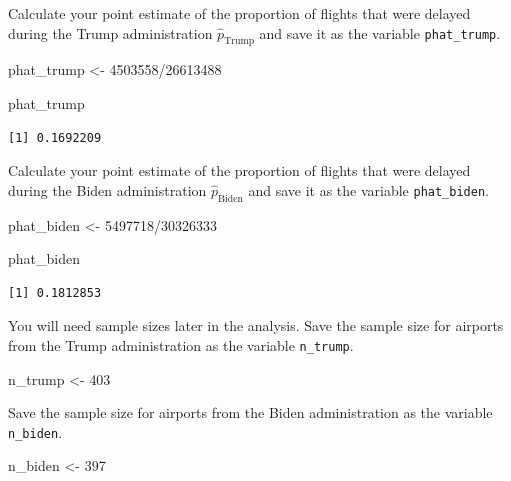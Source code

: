 \documentclass[
  letterpaper,
  DIV=11,
  numbers=noendperiod]{scrartcl}
\newenvironment{Shaded}{\begin{snugshade}}{\end{snugshade}}
\newcommand{\DecValTok}[1]{\textcolor[rgb]{0.68,0.00,0.00}{#1}}
\newcommand{\NormalTok}[1]{\textcolor[rgb]{0.00,0.23,0.31}{#1}}
\newcommand{\OtherTok}[1]{\textcolor[rgb]{0.00,0.23,0.31}{#1}}
\newcommand{\SpecialCharTok}[1]{\textcolor[rgb]{0.37,0.37,0.37}{#1}}
\begin{document}
Calculate your point estimate of the proportion of flights that were
delayed during the Trump administration \(\hat{p}_{\text{Trump}}\) and
save it as the variable \texttt{phat\_trump}.

\begin{Shaded}
\begin{Highlighting}[]
\NormalTok{phat\_trump }\OtherTok{\textless{}{-}} \DecValTok{4503558}\SpecialCharTok{/}\DecValTok{26613488}

\NormalTok{phat\_trump}
\end{Highlighting}
\end{Shaded}

\begin{verbatim}
[1] 0.1692209
\end{verbatim}

Calculate your point estimate of the proportion of flights that were
delayed during the Biden administration \(\hat{p}_{\text{Biden}}\) and
save it as the variable \texttt{phat\_biden}.

\begin{Shaded}
\begin{Highlighting}[]
\NormalTok{phat\_biden }\OtherTok{\textless{}{-}} \DecValTok{5497718}\SpecialCharTok{/}\DecValTok{30326333}

\NormalTok{phat\_biden}
\end{Highlighting}
\end{Shaded}

\begin{verbatim}
[1] 0.1812853
\end{verbatim}

You will need sample sizes later in the analysis. Save the sample size
for airports from the Trump administration as the variable
\texttt{n\_trump}.

\begin{Shaded}
\begin{Highlighting}[]
\NormalTok{n\_trump }\OtherTok{\textless{}{-}} \DecValTok{403}
\end{Highlighting}
\end{Shaded}

Save the sample size for airports from the Biden administration as the
variable \texttt{n\_biden}.

\begin{Shaded}
\begin{Highlighting}[]
\NormalTok{n\_biden }\OtherTok{\textless{}{-}} \DecValTok{397}
\end{Highlighting}
\end{Shaded}
\end{document}
